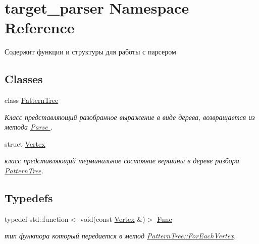 \hypertarget{namespacetarget__parser}{}\section{target\+\_\+parser Namespace Reference}
\label{namespacetarget__parser}


Содержит функции и структуры для работы с парсером  


\subsection*{Classes}
\begin{DoxyCompactItemize}
\item 
class \hyperlink{classtarget__parser_1_1PatternTree}{Pattern\+Tree}
\begin{DoxyCompactList}\small\item\em Класс представляющий разобранное выражение в виде дерева, возвращается из метода \hyperlink{namespacetarget__parser_a3e0ffa10d4fd38f05986d81c0529fdc1}{Parse }. \end{DoxyCompactList}\item 
struct \hyperlink{structtarget__parser_1_1Vertex}{Vertex}
\begin{DoxyCompactList}\small\item\em класс представляющий терминальное состояние вершины в дереве разбора \hyperlink{classtarget__parser_1_1PatternTree}{Pattern\+Tree}. \end{DoxyCompactList}\end{DoxyCompactItemize}
\subsection*{Typedefs}
\begin{DoxyCompactItemize}
\item 
typedef std\+::function$<$ void(const \hyperlink{structtarget__parser_1_1Vertex}{Vertex} \&)$>$ \hyperlink{namespacetarget__parser_aa28dbbced739f360834455cbffeaa6e4}{Func}\hypertarget{namespacetarget__parser_aa28dbbced739f360834455cbffeaa6e4}{}\label{namespacetarget__parser_aa28dbbced739f360834455cbffeaa6e4}

\begin{DoxyCompactList}\small\item\em тип функтора который передается в метод \hyperlink{classtarget__parser_1_1PatternTree_a851ee4b1279c2dcfc4557cab03f8aa83}{Pattern\+Tree\+::\+For\+Each\+Vertex}. \end{DoxyCompactList}\end{DoxyCompactItemize}

